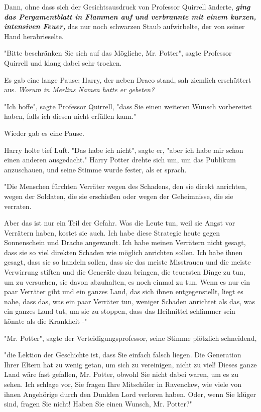 {Dann, ohne dass sich der Gesichtsausdruck von Professor Quirrell änderte, \textbf{\emph{ging das Pergamentblatt in Flammen auf und verbrannte mit einem kurzen, intensiven Feuer,}} das nur noch schwarzen Staub aufwirbelte, der von seiner Hand herabrieselte.

"Bitte beschränken Sie sich auf das Mögliche, Mr. Potter", sagte Professor Quirrell und klang dabei sehr trocken.

Es gab eine lange Pause; Harry, der neben Draco stand, sah ziemlich erschüttert aus. \emph{Worum in Merlins Namen hatte er gebeten?}

"Ich hoffe", sagte Professor Quirrell, "dass Sie einen weiteren Wunsch vorbereitet haben, falls ich diesen nicht erfüllen kann."

Wieder gab es eine Pause.

Harry holte tief Luft. "Das habe ich nicht", sagte er, "aber ich habe mir schon einen anderen ausgedacht." Harry Potter drehte sich um, um das Publikum anzuschauen, und seine Stimme wurde fester, als er sprach.

"Die Menschen fürchten Verräter wegen des Schadens, den sie direkt anrichten, wegen der Soldaten, die sie erschießen oder wegen der Geheimnisse, die sie verraten.

Aber das ist nur ein Teil der Gefahr. Was die Leute tun, weil sie Angst vor Verrätern haben, kostet sie auch. Ich habe diese Strategie heute gegen Sonnenschein und Drache angewandt. Ich habe meinen Verrätern nicht gesagt, dass sie so viel direkten Schaden wie möglich anrichten sollen. Ich habe ihnen gesagt, dass sie so handeln sollen, dass sie das meiste Misstrauen und die meiste Verwirrung stiften und die Generäle dazu bringen, die teuersten Dinge zu tun, um zu versuchen, sie davon abzuhalten, es noch einmal zu tun. Wenn es nur ein paar Verräter gibt und ein ganzes Land, das sich ihnen entgegenstellt, liegt es nahe, dass das, was ein paar Verräter tun, weniger Schaden anrichtet als das, was ein ganzes Land tut, um sie zu stoppen, dass das Heilmittel schlimmer sein könnte als die Krankheit -"

"Mr. Potter", sagte der Verteidigungsprofessor, seine Stimme plötzlich schneidend,

"die Lektion der Geschichte ist, dass Sie einfach falsch liegen. Die Generation Ihrer Eltern hat zu wenig getan, um sich zu vereinigen, nicht zu viel! Dieses ganze Land wäre fast gefallen, Mr. Potter, obwohl Sie nicht dabei waren, um es zu sehen. Ich schlage vor, Sie fragen Ihre Mitschüler in Ravenclaw, wie viele von ihnen Angehörige durch den Dunklen Lord verloren haben. Oder, wenn Sie klüger sind, fragen Sie nicht! Haben Sie einen Wunsch, Mr. Potter?"

}
